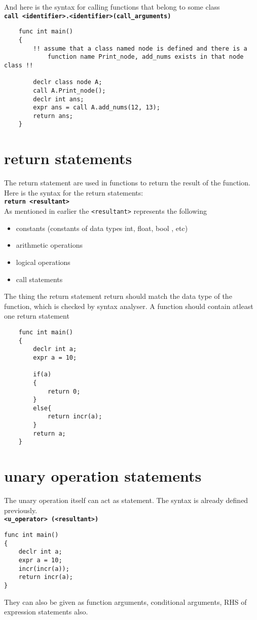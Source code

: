 \documentclass[journal, 18pt]{report}
\begin{document}
And here is the syntax for calling functions that belong to some class
\\
\textbf{\texttt{call <identifier>.<identifier>(call\_arguments)}}
\begin{lstlisting}
    func int main()
    {
        !! assume that a class named node is defined and there is a 
            function name Print_node, add_nums exists in that node class !!

        declr class node A;
        call A.Print_node();
        declr int ans;
        expr ans = call A.add_nums(12, 13);
        return ans;
    }
\end{lstlisting}

\section{return statements}
The return statement are used in functions to return the result of the function. Here is the syntax for the return statements:\\
\textbf{\texttt{return <resultant>}}\\
As mentioned in earlier the \texttt{<resultant>} represents the following
\begin{itemize}
    \item constants (constants of data types int, float, bool , etc)
    \item arithmetic operations
    \item logical operations
    \item call statements
\end{itemize}
The thing the return statement return should match the data type of the function, which is checked by syntax analyser. A function should contain atleast one return statement
\begin{lstlisting}
    func int main()
    {
        declr int a;
        expr a = 10;
        
        if(a)
        {
            return 0;
        }
        else{
            return incr(a);
        }
        return a;
    }
\end{lstlisting}
\section{unary operation statements}
The unary operation itself can act as statement. The syntax is already defined previously.\\
\textbf{\texttt{<u\_operator> (<resultant>)}}
\begin{lstlisting}
func int main()
{
    declr int a;
    expr a = 10;
    incr(incr(a));
    return incr(a);
}
\end{lstlisting}
They can also be given as function arguments, conditional arguments, RHS of expression statements also.
\end{document}
